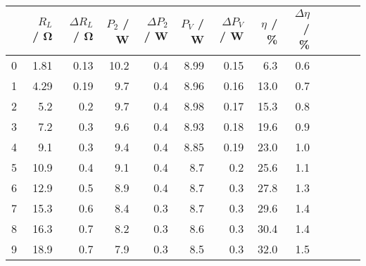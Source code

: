 \begin{tabular}{lrrrrrrrrrrrr}
	\toprule
	{} & $R_L$ / \si{\ohm} & $\Delta R_L$ / \si{\ohm} & $P_2$ / \si{\watt} & $\Delta P_2$ / \si{\watt} & $P_V$ / \si{\watt} & $\Delta P_V$ / \si{\watt} & $\eta$ / \si{\percent} & $\Delta \eta$ / \si{\percent} \\
	\midrule
	0  & 1.81              & 0.13                     & 10.2               & 0.4                       & 8.99               & 0.15                      & 6.3                    & 0.6                           \\
	1  & 4.29              & 0.19                     & 9.7                & 0.4                       & 8.96               & 0.16                      & 13.0                   & 0.7                           \\
	2  & 5.2               & 0.2                      & 9.7                & 0.4                       & 8.98               & 0.17                      & 15.3                   & 0.8                           \\
	3  & 7.2               & 0.3                      & 9.6                & 0.4                       & 8.93               & 0.18                      & 19.6                   & 0.9                           \\
	4  & 9.1               & 0.3                      & 9.4                & 0.4                       & 8.85               & 0.19                      & 23.0                   & 1.0                           \\
	5  & 10.9              & 0.4                      & 9.1                & 0.4                       & 8.7                & 0.2                       & 25.6                   & 1.1                           \\
	6  & 12.9              & 0.5                      & 8.9                & 0.4                       & 8.7                & 0.3                       & 27.8                   & 1.3                           \\
	7  & 15.3              & 0.6                      & 8.4                & 0.3                       & 8.7                & 0.3                       & 29.6                   & 1.4                           \\
	8  & 16.3              & 0.7                      & 8.2                & 0.3                       & 8.6                & 0.3                       & 30.4                   & 1.4                           \\
	9  & 18.9              & 0.7                      & 7.9                & 0.3                       & 8.5                & 0.3                       & 32.0                   & 1.5                           \\

\end{tabular}
